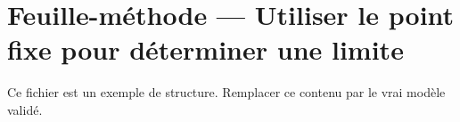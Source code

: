 \documentclass[11pt,a4paper]{article}
\begin{document}
\section*{Feuille-méthode — Utiliser le point fixe pour déterminer une limite}

Ce fichier est un exemple de structure. Remplacer ce contenu par le vrai modèle validé.
\end{document}
